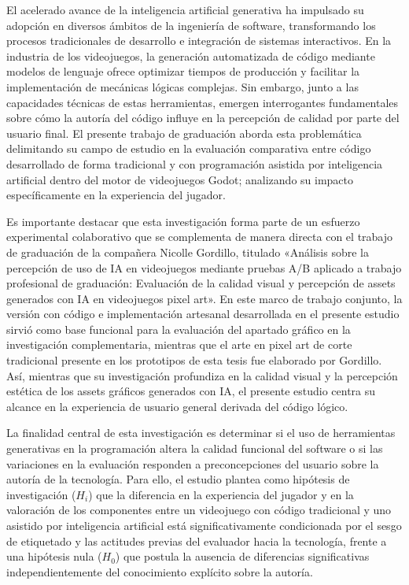 El acelerado avance de la inteligencia artificial generativa ha impulsado su adopción en diversos ámbitos de la ingeniería de software, transformando los procesos tradicionales de desarrollo e integración de sistemas interactivos. En la industria de los videojuegos, la generación automatizada de código mediante modelos de lenguaje ofrece optimizar tiempos de producción y facilitar la implementación de mecánicas lógicas complejas. Sin embargo, junto a las capacidades técnicas de estas herramientas, emergen interrogantes fundamentales sobre cómo la autoría del código influye en la percepción de calidad por parte del usuario final. El presente trabajo de graduación aborda esta problemática delimitando su campo de estudio en la evaluación comparativa entre código desarrollado de forma tradicional y con programación asistida por inteligencia artificial dentro del motor de videojuegos Godot; analizando su impacto específicamente en la experiencia del jugador.

Es importante destacar que esta investigación forma parte de un esfuerzo experimental colaborativo que se complementa de manera directa con el trabajo de graduación de la compañera Nicolle Gordillo, titulado «Análisis sobre la percepción de uso de IA en videojuegos mediante pruebas A/B aplicado a trabajo profesional de graduación: Evaluación de la calidad visual y percepción de assets generados con IA en videojuegos pixel art». En este marco de trabajo conjunto, la versión con código e implementación artesanal desarrollada en el presente estudio sirvió como base funcional para la evaluación del apartado gráfico en la investigación complementaria, mientras que el arte en pixel art de corte tradicional presente en los prototipos de esta tesis fue elaborado por Gordillo. Así, mientras que su investigación profundiza en la calidad visual y la percepción estética de los assets gráficos generados con IA, el presente estudio centra su alcance en la experiencia de usuario general derivada del código lógico.

La finalidad central de esta investigación es determinar si el uso de herramientas generativas en la programación altera la calidad funcional del software o si las variaciones en la evaluación responden a preconcepciones del usuario sobre la autoría de la tecnología. Para ello, el estudio plantea como hipótesis de investigación ($H_i$) que la diferencia en la experiencia del jugador y en la valoración de los componentes entre un videojuego con código tradicional y uno asistido por inteligencia artificial está significativamente condicionada por el sesgo de etiquetado y las actitudes previas del evaluador hacia la tecnología, frente a una hipótesis nula ($H_0$) que postula la ausencia de diferencias significativas independientemente del conocimiento explícito sobre la autoría.

